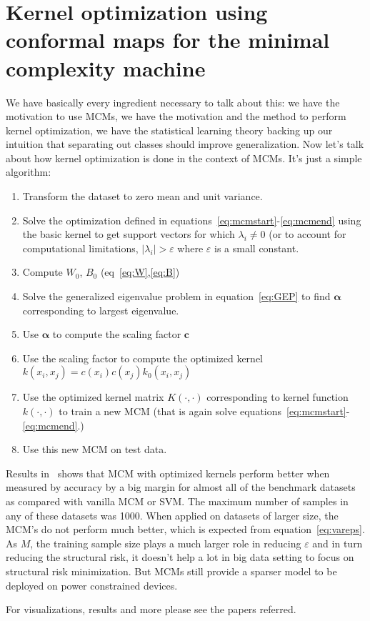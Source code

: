\documentclass[11pt]{article}
\begin{document}
\section{Kernel optimization using conformal maps for the minimal complexity
machine~\cite{keropt}}
We have basically every ingredient necessary to talk about this: we have the
motivation to use MCMs, we have the motivation and the method to perform
kernel optimization, we have the statistical learning theory backing up our
intuition that separating out classes should improve generalization. Now let's talk about how
kernel optimization is done in the context of MCMs. It's just a simple
algorithm:
\begin{enumerate}
    \item Transform the dataset to zero mean and unit variance.
    \item Solve the optimization defined in
        equations~\ref{eq:mcmstart}\nobreakdash-\ref{eq:mcmend} using the basic kernel to
        get support vectors for which $\lambda_i \ne 0$ (or to account for
        computational limitations, $\lvert\lambda_i\rvert > \varepsilon$ where
        $\varepsilon$ is a small constant.
    \item Compute $W_0$, $B_0$ (eq~\ref{eq:W},\ref{eq:B})
    \item Solve the generalized eigenvalue problem in equation~\ref{eq:GEP} to
        find $\mathbf{\alpha}$ corresponding to largest eigenvalue.
    \item Use $\mathbf{\alpha}$ to compute the scaling factor $\mathbf{c}$
    \item Use the scaling factor to compute the optimized kernel
        $k(x_i,x_j)=c(x_i)c(x_j)k_0(x_i,x_j)$
    \item Use the optimized kernel matrix $K(\cdot,\cdot)$ corresponding to
        kernel function $k(\cdot,\cdot)$ to train a new MCM (that is again solve
        equations~\ref{eq:mcmstart}\nobreakdash-\ref{eq:mcmend}.)
    \item Use this new MCM on test data.
\end{enumerate}
\par
Results in~\cite{keropt} shows that MCM with optimized kernels perform better when
measured by accuracy by a big margin for almost all of the benchmark datasets as
compared with vanilla MCM or SVM.  The maximum number of samples in any of these
datasets was 1000. When applied on datasets of larger size, the MCM's do not
perform much better, which is expected from equation~\ref{eq:vareps}. As $M$,
the training sample size plays a much larger role in reducing $\varepsilon$ and
in turn reducing the structural risk, it doesn't help a lot in big data setting
to focus on structural risk minimization. But MCMs still provide a sparser model
to be deployed on power constrained devices.\par
For visualizations, results and more please see the papers referred.
\afterpage{\clearpage}
\end{document}
